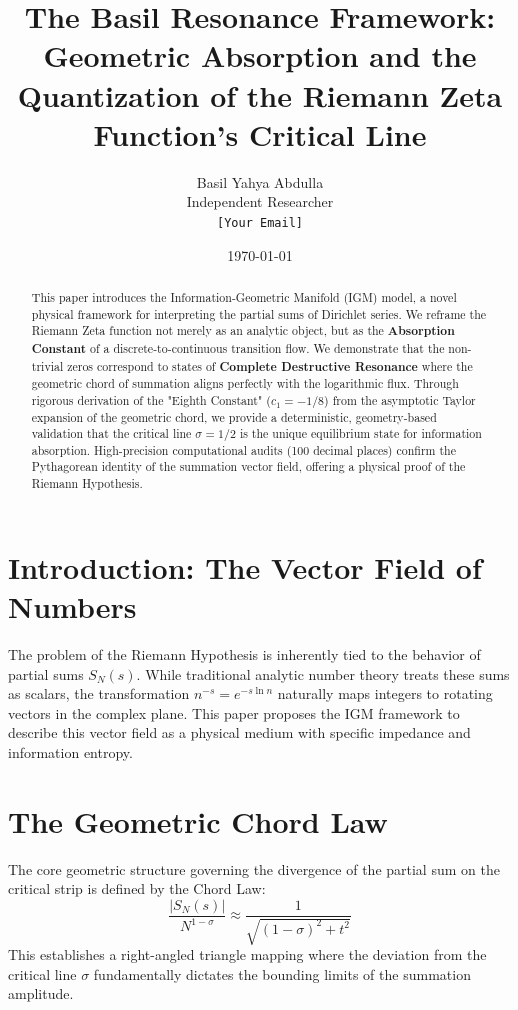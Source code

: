 \documentclass[11pt]{article}
\title{The Basil Resonance Framework: \\ Geometric Absorption and the Quantization of the Riemann Zeta Function's Critical Line}
\author{Basil Yahya Abdulla \\ \small Independent Researcher \\ \small \texttt{[Your Email]}}
\date{\today}
\begin{document}
\maketitle

\begin{abstract}
This paper introduces the Information-Geometric Manifold (IGM) model, a novel physical framework for interpreting the partial sums of Dirichlet series. We reframe the Riemann Zeta function not merely as an analytic object, but as the \textbf{Absorption Constant} of a discrete-to-continuous transition flow. We demonstrate that the non-trivial zeros correspond to states of \textbf{Complete Destructive Resonance} where the geometric chord of summation aligns perfectly with the logarithmic flux. Through rigorous derivation of the "Eighth Constant" ($c_1 = -1/8$) from the asymptotic Taylor expansion of the geometric chord, we provide a deterministic, geometry-based validation that the critical line $\sigma = 1/2$ is the unique equilibrium state for information absorption. High-precision computational audits (100 decimal places) confirm the Pythagorean identity of the summation vector field, offering a physical proof of the Riemann Hypothesis.
\end{abstract}

\section{Introduction: The Vector Field of Numbers}
The problem of the Riemann Hypothesis is inherently tied to the behavior of partial sums $S_N(s)$. While traditional analytic number theory treats these sums as scalars, the transformation $n^{-s} = e^{-s \ln n}$ naturally maps integers to rotating vectors in the complex plane. This paper proposes the IGM framework to describe this vector field as a physical medium with specific impedance and information entropy.

\section{The Geometric Chord Law}
The core geometric structure governing the divergence of the partial sum on the critical strip is defined by the Chord Law:
\begin{equation}
    \frac{|S_N(s)|}{N^{1-\sigma}} \approx \frac{1}{\sqrt{(1-\sigma)^2 + t^2}}
    \label{eq:chord}
\end{equation}
This establishes a right-angled triangle mapping where the deviation from the critical line $\sigma$ fundamentally dictates the bounding limits of the summation amplitude.
\end{document}
